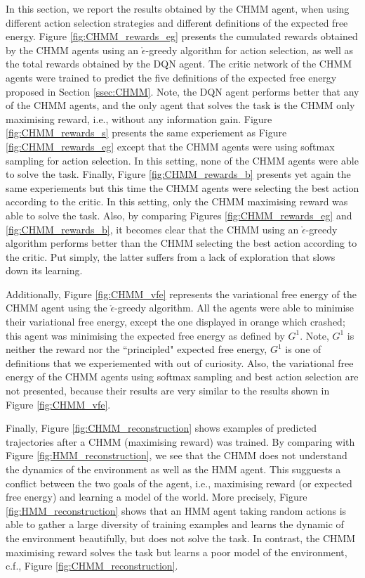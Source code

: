 \documentclass[twoside,11pt]{article}
\begin{document}
In this section, we report the results obtained by the CHMM agent, when using different action selection strategies and different definitions of the expected free energy. Figure \ref{fig:CHMM_rewards_eg} presents the cumulated rewards obtained by the CHMM agents using an $\mathring{\epsilon}$-greedy algorithm for action selection, as well as the total rewards obtained by the DQN agent. The critic network of the CHMM agents were trained to predict the five definitions of the expected free energy proposed in Section \ref{ssec:CHMM}. Note, the DQN agent performs better that any of the CHMM agents, and the only agent that solves the task is the CHMM only maximising reward, i.e., without any information gain. Figure \ref{fig:CHMM_rewards_s} presents the same experiement as Figure \ref{fig:CHMM_rewards_eg} except that the CHMM agents were using softmax sampling for action selection. In this setting, none of the CHMM agents were able to solve the task. Finally, Figure \ref{fig:CHMM_rewards_b} presents yet again the same experiements but this time the CHMM agents were selecting the best action according to the critic. In this setting, only the CHMM maximising reward was able to solve the task. Also, by comparing Figures \ref{fig:CHMM_rewards_eg} and \ref{fig:CHMM_rewards_b}, it becomes clear that the CHMM using an $\mathring{\epsilon}$-greedy algorithm performs better than the CHMM selecting the best action according to the critic. Put simply, the latter suffers from a lack of exploration that slows down its learning. 

Additionally, Figure \ref{fig:CHMM_vfe} represents the variational free energy of the CHMM agent using the $\mathring{\epsilon}$-greedy algorithm. All the agents were able to minimise their variational free energy, except the one displayed in orange which crashed; this agent was minimising the expected free energy as defined by $G^1$. Note, $G^1$ is neither the reward nor the ``principled" expected free energy, $G^1$ is one of definitions that we experiemented with out of curiosity. Also, the variational free energy of the CHMM agents using softmax sampling and best action selection are not presented, because their results are very similar to the results shown in Figure \ref{fig:CHMM_vfe}.

Finally, Figure \ref{fig:CHMM_reconstruction} shows examples of predicted trajectories after a CHMM (maximising reward) was trained. By comparing with Figure    \ref{fig:HMM_reconstruction}, we see that the CHMM does not understand the dynamics of the environment as well as the HMM agent. This sugguests a conflict between the two goals of the agent, i.e., maximising reward (or expected free energy) and learning a model of the world. More precisely, Figure \ref{fig:HMM_reconstruction} shows that an HMM agent taking random actions is able to gather a large diversity of training examples and learns the dynamic of the environment beautifully, but does not solve the task. In contrast, the CHMM maximising reward solves the task but learns a poor model of the environment, c.f., Figure \ref{fig:CHMM_reconstruction}.
\end{document}
